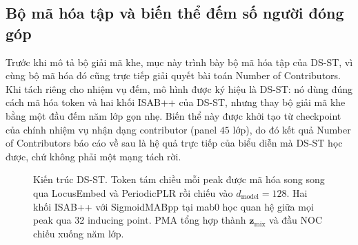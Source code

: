 \documentclass[12pt,a4paper]{article}
\begin{document}
\subsection{Bộ mã hóa tập và biến thể đếm số người đóng góp}

Trước khi mô tả bộ giải mã khe, mục này trình bày bộ mã hóa tập của DS-ST, vì cùng bộ mã hóa đó cũng trực tiếp giải quyết bài toán Number of Contributors. Khi tách riêng cho nhiệm vụ đếm, mô hình được ký hiệu là DS-ST: nó dùng đúng cách mã hóa token và hai khối ISAB++ của DS-ST, nhưng thay bộ giải mã khe bằng một đầu đếm năm lớp gọn nhẹ. Biến thể này được khởi tạo từ checkpoint của chính nhiệm vụ nhận dạng contributor (panel \(45\) lớp), do đó kết quả Number of Contributors báo cáo về sau là hệ quả trực tiếp của biểu diễn mà DS-ST học được, chứ không phải một mạng tách rời.

\begin{figure}[H]
\centering
{}
\caption{Kiến trúc DS-ST. Token tám chiều mỗi peak được mã hóa song song qua LocusEmbed và PeriodicPLR rồi chiếu vào $d_{\mathrm{model}}=128$. Hai khối ISAB++ với SigmoidMABpp tại mab0 học quan hệ giữa mọi peak qua 32 inducing point. PMA tổng hợp thành $\bm{z}_{\mathrm{mix}}$ và đầu NOC chiếu xuống năm lớp.}
\label{fig:settransv4}
\end{figure}
\end{document}
